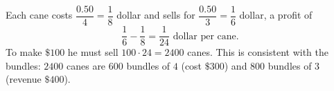 Each cane costs $\dfrac{0.50}{4}=\dfrac{1}{8}$ dollar and sells for $\dfrac{0.50}{3}=\dfrac{1}{6}$ dollar, a profit of
\[
\dfrac{1}{6}-\dfrac{1}{8}=\dfrac{1}{24}\text{ dollar per cane}.
\]
To make $\$100$ he must sell $100\cdot24=\boxed{2400}$ canes. This is consistent with the bundles: $2400$ canes are $600$ bundles of $4$ (cost $\$300$) and $800$ bundles of $3$ (revenue $\$400$).
